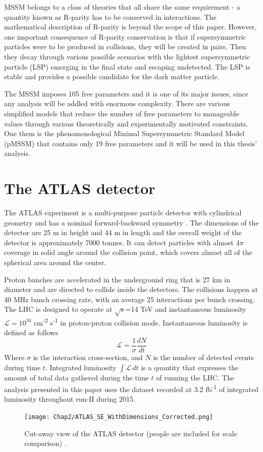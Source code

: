 MSSM belongs to a class of theories that all share the same requirement - a quantity known as R-parity has to be conserved in interactions. The mathematical description of R-parity is beyond the scope of this paper. However, one important consequence of R-parity conservation is that if supersymmetric particles were to be produced in collisions, they will be created in pairs. Then they decay through various possible scenarios with the lightest supersymmetric particle (LSP) emerging in the final state and escaping undetected. The LSP is stable and provides a possible candidate for the dark matter particle.

The MSSM imposes 105 free parameters and it is one of its major issues, since any analysis will be addled with enormous complexity. There are various simplified models that reduce the number of free parameters to manageable values through various theoretically and experimentally motivated constraints. One them is the phenomenological Minimal Supersymmetric Standard Model (pMSSM) that contains only 19 free parameters and it will be used in this thesis' analysis. 





\section{The ATLAS detector}
\label{sec:atlas}
The ATLAS experiment is a multi-purpose particle detector with cylindrical geometry and has a nominal forward-backward symmetry \citep{aad2008atlas}. The dimensions of the detector are 25 m in height and 44 m in length and the overall weight of the detector is approximately 7000 tonnes.
It can detect particles with almost 4$\pi$ coverage in solid angle around the collision point, which covers almost all of the spherical area around the center. 

Proton bunches are accelerated in the underground ring that is 27 km in diameter and are directed to collide inside the detectors. The collisions happen at 40 MHz bunch crossing rate, with an average 25 interactions per bunch crossing. The LHC is designed to operate at $\sqrt{s}$=14 TeV and instantaneous luminosity $\mathcal{L} = 10^{34}$ cm\textsuperscript{-2} s\textsuperscript{-1} in proton-proton collision mode. Instantaneous luminosity is defined as follows
\begin{equation}
\mathcal{L} = \frac{1}{\sigma}\frac{dN}{dt}
\end{equation}  
Where $\sigma$ is the interaction cross-section, and $N$ is the number of detected events during time $t$. Integrated luminosity $\int \mathcal{L}\, dt$ is a quantity that expresses the amount of total data gathered during the time $t$ of running the LHC. The analysis presented in this paper uses the dataset recorded at 3.2 fb\textsuperscript{-1} of integrated luminosity throughout run-II during 2015.  
\begin{figure}[!t]
	\centering
    \captionsetup{width=\textwidth}
	\texttt{[image: Chap2/ATLAS\_SE\_WithDimensions\_Corrected.png]}
\caption{\label{fig:detector}  Cut-away view of the ATLAS detector (people are included for scale comparison) \citep{aad2008atlas}. }
\end{figure}

